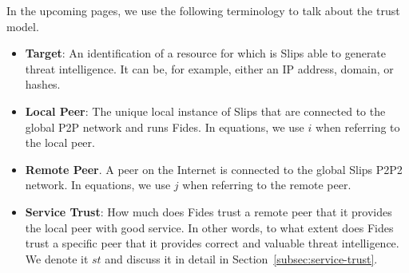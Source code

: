 \vspace{1cm}

\noindent
In the upcoming pages, we use the following terminology to talk about the trust model.

\begin{itemize}

\item \textbf{Target}: An identification of a resource for which is Slips able to generate threat intelligence. It can be, for example, either an IP address, domain, or hashes.

\item \textbf{Local Peer}: The unique local instance of Slips that are connected to the global P2P network and runs Fides. In equations, we use $i$ when referring to the local peer.

\item \textbf{Remote Peer}. A peer on the Internet is connected to the global Slips P2P2 network. In equations, we use $j$ when referring to the remote peer.

\item \textbf{Service Trust}: How much does Fides trust a remote peer that it provides the local peer with good service. In other words, to what extent does Fides trust a specific peer that it provides correct and valuable threat intelligence. We denote it $st$ and discuss it in detail in Section~\ref{subsec:service-trust}.

\end{itemize}











